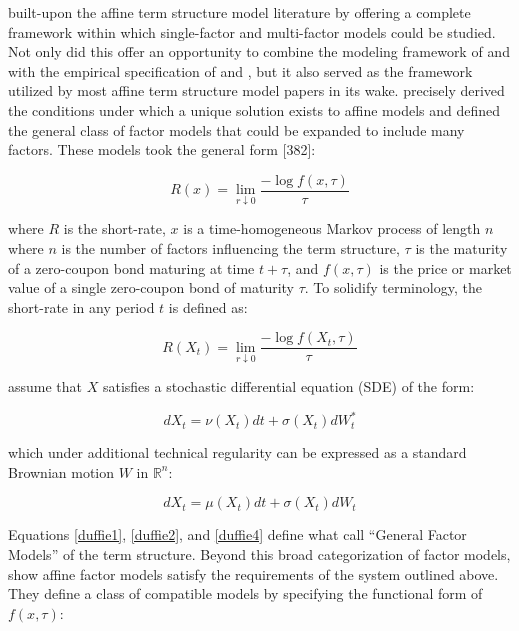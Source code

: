 \documentclass{article}
\numberwithin{equation}{section}
\begin{document}
\citet{duffiekan1996} built-upon the affine term structure model literature by
offering a complete framework within which single-factor and multi-factor
models could be studied. Not only did this offer an opportunity to combine the
modeling framework of \citet{vasicek1977} and \citet{coxingersollross1985} with
the empirical specification of \citet{nelson1987} and
\citet{litterman1991common}, but it also served as the framework utilized by
most affine term structure model papers in its wake. \citet{duffiekan1996}
precisely derived the conditions under which a unique solution exists to affine
models and defined the general class of factor models that could be expanded to
include many factors. These models took the general form
\citep{duffiekan1996}[382]:

\begin{equation}
  R(x)=\lim_{r\downarrow{0}}\frac{-\log{f(x,\tau)}}{\tau}
  \label{duffie1}
\end{equation}

where $R$ is the short-rate, $x$ is a time-homogeneous Markov process of length
$n$ where $n$ is the number of factors influencing the term structure, $\tau$
is the maturity of a zero-coupon bond maturing at time $t+\tau$, and
$f(x,\tau)$ is the price or market value of a single zero-coupon bond of
maturity $\tau$. To solidify terminology, the short-rate in any period $t$ is
defined as:

\begin{equation}
  R(X_t)=\lim_{r\downarrow{0}}\frac{-\log{f(X_t,\tau)}}{\tau}
  \label{duffie2}
\end{equation}

\citet{duffiekan1996} assume that $X$ satisfies a stochastic differential
equation (SDE) of the form:

\begin{equation}
  dX_t=\nu(X_t)dt+\sigma(X_t)dW_t^*
  \label{duffie3}
\end{equation}

which under additional technical regularity can be expressed as a standard
Brownian motion $W$ in $\mathbb{R}^n$:

\begin{equation}
  dX_t=\mu(X_t)dt+\sigma(X_t)dW_t
  \label{duffie4}
\end{equation}

Equations \ref{duffie1}, \ref{duffie2}, and \ref{duffie4} define what
\citet{duffiekan1996} call ``General Factor Models'' of the term structure.
Beyond this broad categorization of factor models, \citet{duffiekan1996} show
affine factor models satisfy the requirements of the system outlined above.
They define a class of compatible models by specifying the functional form of
$f(x,\tau)$:
\end{document}
